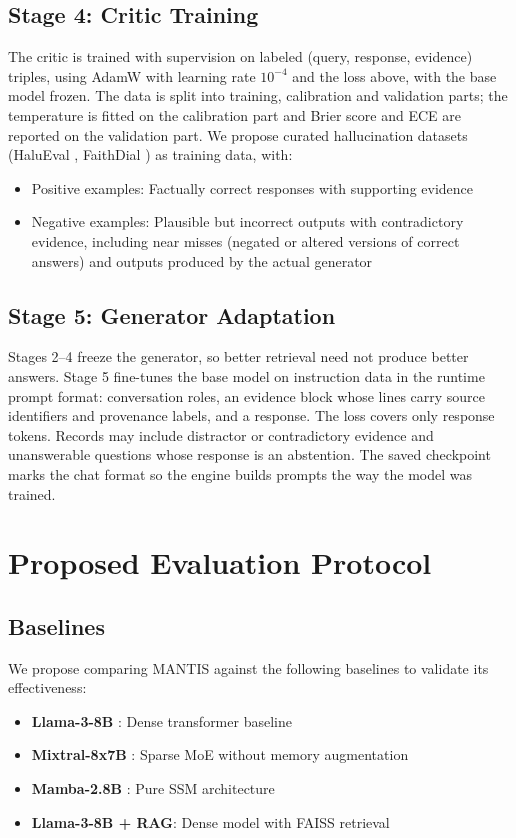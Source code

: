 \documentclass{article}
\begin{document}
\subsection{Stage 4: Critic Training}

The critic is trained with supervision on labeled (query, response, evidence) triples, using AdamW with learning rate $10^{-4}$ and the loss above, with the base model frozen. The data is split into training, calibration and validation parts; the temperature is fitted on the calibration part and Brier score and ECE are reported on the validation part. We propose curated hallucination datasets (HaluEval \cite{li2023halueval}, FaithDial \cite{dziri2022faithdial}) as training data, with:
\begin{itemize}
    \item Positive examples: Factually correct responses with supporting evidence
    \item Negative examples: Plausible but incorrect outputs with contradictory evidence, including near misses (negated or altered versions of correct answers) and outputs produced by the actual generator
\end{itemize}

\subsection{Stage 5: Generator Adaptation}

Stages 2--4 freeze the generator, so better retrieval need not produce better answers. Stage 5 fine-tunes the base model on instruction data in the runtime prompt format: conversation roles, an evidence block whose lines carry source identifiers and provenance labels, and a response. The loss covers only response tokens. Records may include distractor or contradictory evidence and unanswerable questions whose response is an abstention. The saved checkpoint marks the chat format so the engine builds prompts the way the model was trained.

\section{Proposed Evaluation Protocol}
\label{sec:evaluation}

\subsection{Baselines}

We propose comparing MANTIS against the following baselines to validate its effectiveness:
\begin{itemize}
    \item \textbf{Llama-3-8B} \cite{grattafiori2024llama3}: Dense transformer baseline
    \item \textbf{Mixtral-8x7B} \cite{jiang2024mixtral}: Sparse MoE without memory augmentation
    \item \textbf{Mamba-2.8B} \cite{gu2023mamba}: Pure SSM architecture
    \item \textbf{Llama-3-8B + RAG}: Dense model with FAISS retrieval
\end{itemize}
\end{document}
